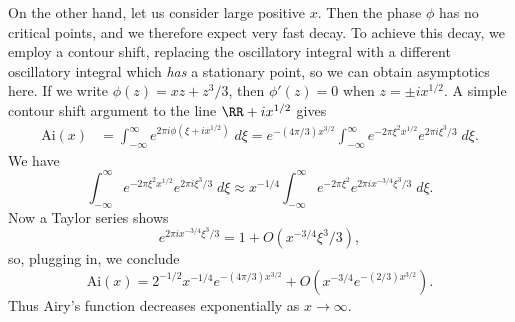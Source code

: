 \begin{example}
  On the other hand, let us consider large positive $x$. Then the phase $\phi$ has no critical points, and we therefore expect very fast decay. To achieve this decay, we employ a contour shift, replacing the oscillatory integral with a different oscillatory integral which \emph{has} a stationary point, so we can obtain asymptotics here. If we write $\phi(z) = xz + z^3/3$, then $\phi'(z) = 0$ when $z = \pm i x^{1/2}$. A simple contour shift argument to the line $\RR + i x^{1/2}$ gives
  \begin{align*}
    \text{Ai}(x) &= \int_{-\infty}^\infty e^{2 \pi i \phi(\xi + ix^{1/2})}\; d\xi = e^{- (4\pi/3) x^{3/2}} \int_{-\infty}^\infty e^{- 2 \pi \xi^2 x^{1/2}} e^{2 \pi i \xi^3 / 3} \; d\xi.
  \end{align*}
  We have
  \[ \int_{-\infty}^\infty e^{- 2 \pi \xi^2 x^{1/2}} e^{2 \pi i \xi^3/3}\; d\xi \approx x^{-1/4} \int_{-\infty}^\infty e^{- 2 \pi \xi^2} e^{2 \pi i x^{-3/4} \xi^3/3}\; d\xi. \]
  Now a Taylor series shows
  \[ e^{2 \pi i x^{-3/4} \xi^3/3} = 1 + O(x^{-3/4} \xi^3/3), \]
  so, plugging in, we conclude
  \[ \text{Ai}(x) = 2^{-1/2} x^{-1/4} e^{-(4 \pi /3) x^{3/2}} + O(x^{-3/4} e^{-(2/3) x^{3/2}}). \]
  Thus Airy's function decreases exponentially as $x \to \infty$.
\end{example}


